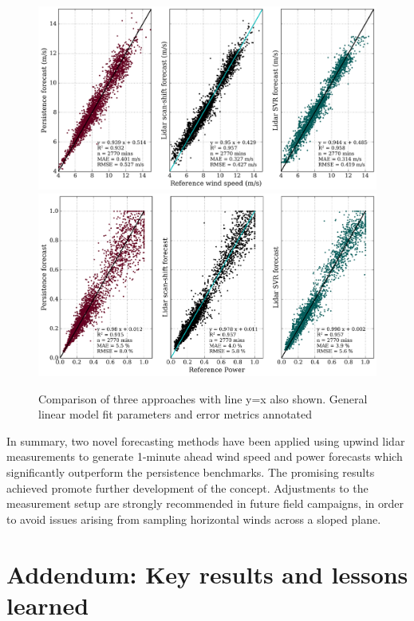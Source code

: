 \begin{figure}[htbp]
    \centering
        \includegraphics[width=1.0\textwidth]{graphics/results/waffle/waffle_forecast_all_results.png}
        \includegraphics[width=1.0\textwidth]{graphics/results/waffle/waffle_forecast_all_power_results.png}
    \caption{Comparison of three approaches with line y=x also shown. General linear model fit parameters and error metrics annotated}
    \label{fig:waffle_forecast_all_results}
\end{figure}

In summary, two novel forecasting methods have been applied using upwind lidar measurements to generate 1-minute ahead wind speed and power forecasts which significantly outperform the persistence benchmarks. The promising results achieved promote further development of the concept. Adjustments to the measurement setup are strongly recommended in future field campaigns, in order to avoid issues arising from sampling horizontal winds across a sloped plane.

\clearpage
\section{Addendum: Key results and lessons learned}
\label{sec:waffle_addendum}

